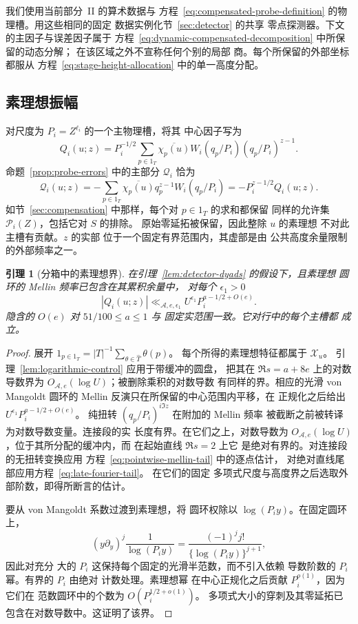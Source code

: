 \documentclass[11pt,a4paper]{article}
\numberwithin{equation}{section}
\numberwithin{figure}{section}
\newtheorem{lemma}[theorem]{引理}
\theoremstyle{definition}
\theoremstyle{remark}
\begin{document}
我们使用当前部分~II 的算术数据与
方程~\eqref{eq:compensated-probe-definition} 的物理槽。用这些相同的固定
数据实例化节~\ref{sec:detector} 的共享
零点探测器。下文的主因子与误差因子属于
方程~\eqref{eq:dynamic-compensated-decomposition} 中所保留的动态分解；
在该区域之外不宣称任何个别的局部
商。每个所保留的外部坐标都服从
方程~\eqref{eq:stage-height-allocation} 中的单一高度分配。

\subsection{素理想振幅}\label{sec:amplitudes}

对尺度为 \(P_i=Z^{\ell_i}\) 的一个主物理槽，将其
中心因子写为
\[
 Q_i(u;z)=P_i^{-1/2}\sum_{p\in1_T}
   \overline{\chi_p(u)}W_i(q_p/P_i)(q_p/P_i)^{z-1}.
\]
命题~\ref{prop:probe-errors} 中的主部分 \(\mathcal Q_i\) 恰为
\[
 \mathcal Q_i(u;z)=-\sum_{p\in1_T}\overline{\chi_p(u)}q_p^{z-1}W_i(q_p/P_i)
 =-P_i^{z-1/2}Q_i(u;z).
\]
如节~\ref{sec:compensation} 中那样，每个对 \(p\in1_T\) 的求和都保留
同样的允许集 \(\mathcal P_i(Z)\)，包括它对 \(S\) 的排除。
原始零延拓被保留，因此整除 \(u\) 的素理想
不对此主槽有贡献。\(z\) 的实部
位于一个固定有界范围内，其虚部是由
公共高度余量限制的外部频率之一。

\begin{lemma}[分箱中的素理想界]\label{lem:bin-prime-bound}
在引理~\ref{lem:detector-dyads} 的假设下，且素理想
圆环的 Mellin 频率已包含在其累积余量中，
对每个 \(\epsilon_1>0\)
\[
 |Q_i(u;z)|\ll_{\mathcal A,e,\epsilon_1}
 U^{\epsilon_1}P_i^{a-1/2+O(e)}.
\]
隐含的 \(O(e)\) 对 \(51/100\le a\le1\) 与
固定实范围一致。它对行中的每个主槽都
成立。
\end{lemma}

\begin{proof}
展开 \(1_{p\in1_T}=|T|^{-1}\sum_{\theta\in\widehat T}\theta(p)\)。
每个所得的素理想特征都属于 \(\mathcal X_u\)。
引理~\ref{lem:logarithmic-control} 应用于带缓冲的圆盘，
把其在 \(\Re s=a+8e\) 上的对数导数界为
\(O_{\mathcal A,e}(\log U)\)；被删除乘积的对数导数
有同样的界。相应的光滑 von Mangoldt 圆环的
Mellin 反演只在所保留的中心范围内平移，在
正规化之后给出
\(U^{\epsilon_1}P_i^{a-1/2+O(e)}\)。
纯扭转 \((q_p/P_i)^{i\Im z}\) 在附加的 Mellin 频率
被截断之前被转译为对数导数变量。连接段的实
长度有界。在它们之上，对数导数为
\(O_{\mathcal A,e}(\log U)\)，位于其所分配的缓冲内，而
在起始直线 \(\Re s=2\) 上它
是绝对有界的。对连接段的无扭转变换应用
方程~\eqref{eq:pointwise-mellin-tail} 中的逐点估计，
对绝对直线尾部应用方程~\eqref{eq:late-fourier-tail}。
在它们的固定
多项式尺度与高度界之后选取外部阶数，即得所断言的估计。

要从 von Mangoldt 系数过渡到素理想，将
圆环权除以 \(\log(P_i y)\)。在固定圆环上，
\[
 (y\partial_y)^j\frac1{\log(P_i y)}
 =\frac{(-1)^j j!}{\{\log(P_i y)\}^{j+1}},
\]
因此对充分
大的 \(P_i\) 这保持每个固定的光滑半范数，而不引入依赖
导数阶数的 \(P_i\) 幂。有界的 \(P_i\) 由绝对
计数处理。素理想幂
在中心正规化之后贡献 \(P_i^{o(1)}\)，因为它们在
范数圆环中的个数为 \(O(P_i^{1/2+o(1)})\)。
多项式大小的穿刺及其零延拓已
包含在对数导数中。这证明了该界。
\end{proof}
\end{document}
